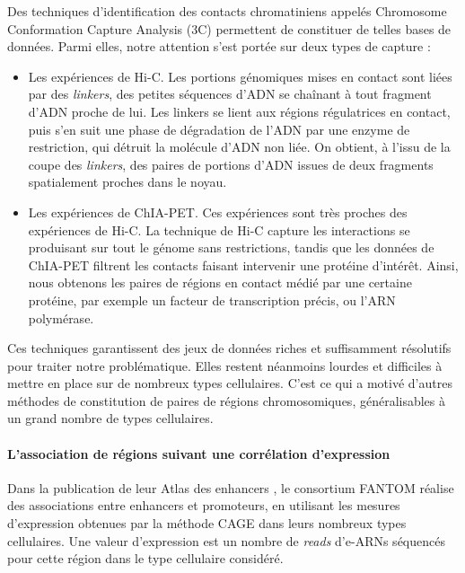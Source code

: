 \documentclass[french]{llncs}
\begin{document}
Des techniques d'identification des contacts chromatiniens appelés Chromosome Conformation Capture Analysis (3C) permettent de constituer de telles bases de données. Parmi elles, notre attention s'est portée sur deux types de capture : 
\begin{itemize}
    \item Les expériences de Hi-C. Les portions génomiques mises en contact sont liées par des \textit{linkers}, des petites séquences d'ADN se chaînant à tout fragment d'ADN proche de lui. Les linkers se lient aux régions régulatrices en contact, puis s'en suit une phase de dégradation de l'ADN par une enzyme de restriction, qui détruit la molécule d'ADN non liée. On obtient, à l'issu de la coupe des \textit{linkers}, des paires de portions d'ADN issues de deux fragments spatialement proches dans le noyau. 
    
    \item Les expériences de ChIA-PET. Ces expériences sont très proches des expériences de Hi-C. La technique de Hi-C capture les interactions se produisant sur tout le génome sans restrictions, tandis que les données de ChIA-PET filtrent les contacts faisant intervenir une protéine d'intérêt. Ainsi, nous obtenons les paires de régions en contact médié par une certaine protéine, par exemple un facteur de transcription précis, ou l'ARN polymérase.
    
\end{itemize}

Ces techniques garantissent des jeux de données riches et suffisamment résolutifs pour traiter notre problématique. Elles restent néanmoins
lourdes et difficiles à mettre en place sur de nombreux types cellulaires.
C'est ce qui a motivé d'autres méthodes de constitution de paires de régions chromosomiques, généralisables à un grand nombre de types cellulaires.

\paragraph{L'association de régions suivant une corrélation d'expression}

 Dans la publication de leur Atlas des enhancers \cite{the_fantom_consortium_atlas_2014}, le consortium FANTOM réalise des associations entre enhancers et promoteurs, en utilisant les mesures d'expression obtenues par la méthode CAGE dans leurs nombreux types cellulaires. Une valeur d'expression est un nombre de \textit{reads} d'e-ARNs séquencés pour cette région dans le type cellulaire considéré.
 
\end{document}
